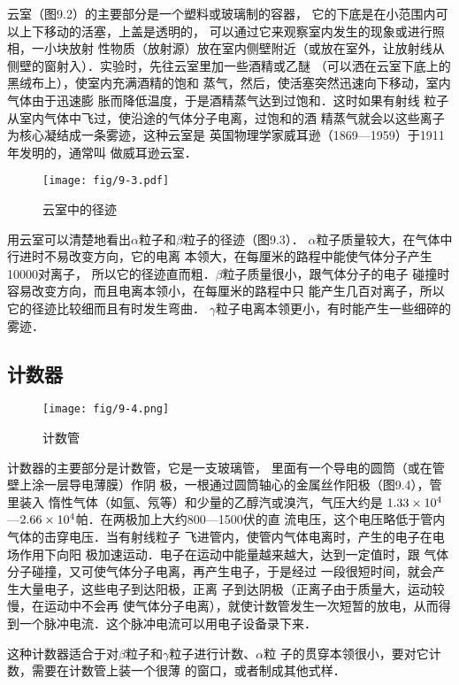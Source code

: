 云室（图9.2）的主要部分是一个塑料或玻璃制的容器，
它的下底是在小范围内可以上下移动的活塞，上盖是透明的，
可以通过它来观察室内发生的现象或进行照相，一小块放射
性物质（放射源）放在室内侧壁附近（或放在室外，让放射线从
侧壁的窗射入）．实验时，先往云室里加一些酒精或乙醚
（可以洒在云室下底上的黑绒布上），使室内充满酒精的饱和
蒸气，然后，使活塞突然迅速向下移动，室内气体由于迅速膨
胀而降低温度，于是酒精蒸气达到过饱和．这时如果有射线
粒子从室内气体中飞过，使沿途的气体分子电离，过饱和的酒
精蒸气就会以这些离子为核心凝结成一条雾迹，这种云室是
英国物理学家威耳逊（1869—1959）于1911年发明的，通常叫
做威耳逊云室．

\begin{figure}[htp]
    \centering
    \texttt{[image: fig/9-3.pdf]}
    \caption{云室中的径迹}
\end{figure}

用云室可以清楚地看出$\alpha$粒子和$\beta$粒子的径迹（图9.3）．
$\alpha$粒子质量较大，在气体中行进时不易改变方向，它的电离
本领大，在每厘米的路程中能使气体分子产生10000对离子，
所以它的径迹直而粗．$\beta$粒子质量很小，跟气体分子的电子
碰撞时容易改变方向，而且电离本领小，在每厘米的路程中只
能产生几百对离子，所以它的径迹比较细而且有时发生弯曲．
$\gamma$粒子电离本领更小，有时能产生一些细碎的雾迹．



\subsection{计数器}
\begin{figure}[htp]\centering
\texttt{[image: fig/9-4.png]}
\caption{计数管}
\end{figure}

计数器的主要部分是计数管，它是一支玻璃管，
里面有一个导电的圆筒（或在管壁上涂一层导电薄膜）作阴
极，一根通过圆筒轴心的金属丝作阳极（图9.4），管里装入
惰性气体（如氩、氖等）和少量的乙醇汽或溴汽，气压大约是
$1.33\times10^4$—$2.66\times10^4$帕．在两极加上大约800—1500伏的直
流电压，这个电压略低于管内气体的击穿电压．当有射线粒子
飞进管内，使管内气体电离时，产生的电子在电场作用下向阳
极加速运动．电子在运动中能量越来越大，达到一定值时，跟
气体分子碰撞，又可使气体分子电离，再产生电子，于是经过
一段很短时间，就会产生大量电子，这些电子到达阳极，正离
子到达阴极（正离子由于质量大，运动较慢，在运动中不会再
使气体分子电离），就使计数管发生一次短暂的放电，从而得
到一个脉冲电流．这个脉冲电流可以用电子设备录下来．

这种计数器适合于对$\beta$粒子和$\gamma$粒子进行计数、$\alpha$粒
子的贯穿本领很小，要对它计数，需要在计数管上装一个很薄
的窗口，或者制成其他式样．


